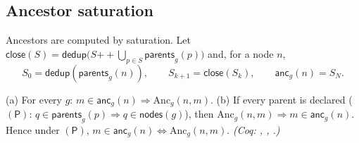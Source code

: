 \subsection{Ancestor saturation}
Ancestors are computed by saturation. Let $\mathsf{close}(S) = \mathsf{dedup}\bigl(S \mathbin{+\!\!+} \bigcup_{p \in S} \mathsf{parents}_g(p)\bigr)$ and, for a node $n$,
\[
S_0 = \mathsf{dedup}(\mathsf{parents}_g(n)), \qquad S_{k+1} = \mathsf{close}(S_k), \qquad \mathsf{anc}_g(n) = S_N .
\]
\begin{thm}\label{thm:anc}
(a) For every $g$: $m \in \mathsf{anc}_g(n) \Rightarrow \mathrm{Anc}_g(n,m)$.
(b) If every parent is declared ($\mathsf{(P)}$: $q \in \mathsf{parents}_g(p) \Rightarrow q \in \mathsf{nodes}(g)$), then $\mathrm{Anc}_g(n,m) \Rightarrow m \in \mathsf{anc}_g(n)$.
Hence under $(\mathsf{P})$, $m \in \mathsf{anc}_g(n) \Leftrightarrow \mathrm{Anc}_g(n,m)$. \emph{(Coq: , , .)}
\end{thm}
